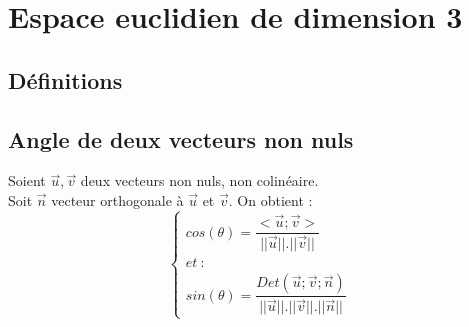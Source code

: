 
\chapter{Espace euclidien de dimension 3}
\section{Définitions}
\section{Angle de deux vecteurs non nuls}
Soient $\overrightarrow{u},\overrightarrow{v}$ deux vecteurs non nuls, non colinéaire.\\
Soit $\overrightarrow{n}$ vecteur orthogonale à $\overrightarrow{u}$ et $\overrightarrow{v}$.
On obtient : 
$$\left\{\begin{array}{l}
   cos(\theta) = \dfrac{<\overrightarrow{u};\overrightarrow{v}>}{||\overrightarrow{u}||.||\overrightarrow{v}||}\\
   et~ : \\
   sin(\theta) = \dfrac{Det(\overrightarrow{u};\overrightarrow{v};\overrightarrow{n})}{||\overrightarrow{u}||.||\overrightarrow{v}||.||\overrightarrow{n}||}
  \end{array}\right.$$
